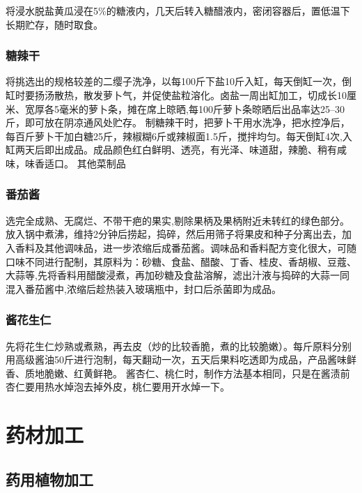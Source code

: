 \documentclass{ctexbook}
\begin{document}
将浸水脱盐黄瓜浸在5\%的糖液内，几天后转入糖醋液内，密闭容器后，置低温下长期贮存，随时取食。
\subsection{糖辣干}
将挑选出的规格较差的二缨子洗净，以每100斤下盐10斤入缸，每天倒缸一次，倒缸时要扬汤散热，散发萝卜气，并促使盐粒溶化。卤盐一周出缸加工，切成长10厘米、宽厚各5毫米的萝卜条，摊在席上晾晒,每100斤萝卜条晾晒后出品率达25--30斤，即可放在阴凉通风处贮存。
制糖辣干时，把萝卜干用水洗净，把水控净后，每百斤萝卜干加白糖25斤，辣椒糊6斤或辣椒面1.5斤，搅拌均匀。每天倒缸4次,入缸两天后即出成品。成品颜色红白鲜明、透亮，有光泽、味道甜，辣脆、稍有咸味，味香适口。
其他菜制品
\subsection{番茄酱}
选完全成熟、无腐烂、不带干疤的果实,剔除果柄及果柄附近未转红的绿色部分。放入锅中煮沸，维持2分钟后捞起，捣碎，然后用筛子将果皮和种子分离出去，加入香料及其他调味品，进一步浓缩后成番茄酱。调味品和香料配方变化很大，可随口味不同进行配制，其原料为：砂糖、食盐、醋酸、丁香、桂皮、香胡椒、豆蔻、大蒜等,先将香料用醋酸浸煮，再加砂糖及食盐溶解，滤出汁液与捣碎的大蒜一同混入番茄酱中,浓缩后趁热装入玻璃瓶中，封口后杀菌即为成品。
\subsection{酱花生仁}
先将花生仁炒熟或煮熟，再去皮（炒的比较香脆，煮的比较脆嫩）。每斤原料分别用高级酱油50斤进行泡制，每天翻动一次，五天后果料吃透即为成品，产品酱味鲜香、质地脆嫩、红黄鲜艳。
酱杏仁、桃仁时，制作方法基本相同，只是在酱渍前杏仁要用热水焯泡去掉外皮，桃仁要用开水焯一下。
\chapter{药材加工}
\section{药用植物加工}
\end{document}
